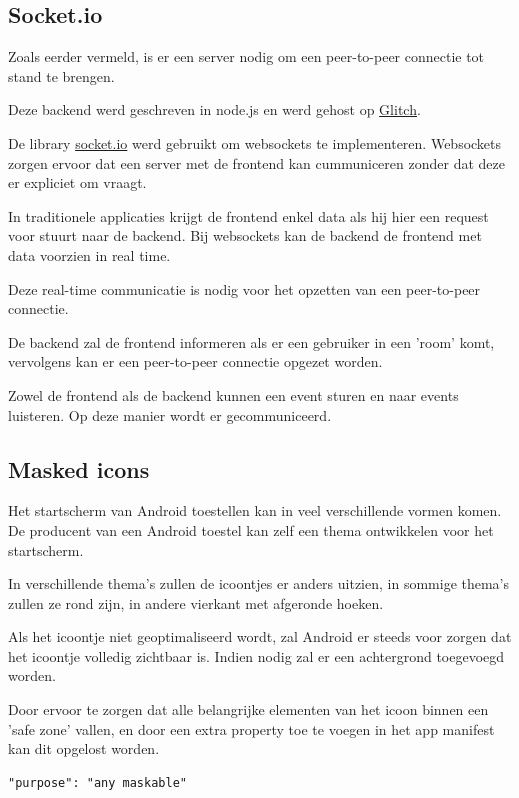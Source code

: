 	\subsection{Socket.io}
	
		Zoals eerder vermeld, is er een server nodig om een peer-to-peer connectie tot stand te brengen.
		
		Deze backend werd geschreven in node.js en werd gehost op \href{https://glitch.com/}{Glitch}.
		
		De library \href{https://socket.io/}{socket.io} werd gebruikt om websockets te implementeren. Websockets zorgen ervoor dat een server met de frontend kan cummuniceren zonder dat deze er expliciet om vraagt. 
		
		In traditionele applicaties krijgt de frontend enkel data als hij hier een request voor stuurt naar de backend. Bij websockets kan de backend de frontend met data voorzien in real time.
		\autocite{Mozilla2020e}
		
		Deze real-time communicatie is nodig voor het opzetten van een peer-to-peer connectie.
		
		De backend zal de frontend informeren als er een gebruiker in een 'room' komt, vervolgens kan er een peer-to-peer connectie opgezet worden.
		
		Zowel de frontend als de backend kunnen een event sturen en naar events luisteren. Op deze manier wordt er gecommuniceerd. 	
		
			
	\subsection{Masked icons}
	
		Het startscherm van Android toestellen kan in veel verschillende vormen komen. De producent van een Android toestel kan zelf een thema ontwikkelen voor het startscherm.
		
		In verschillende thema's zullen de icoontjes er anders uitzien, in sommige thema's zullen ze rond zijn, in andere vierkant met afgeronde hoeken. 
		
		Als het icoontje niet geoptimaliseerd wordt, zal Android er steeds voor zorgen dat het icoontje volledig zichtbaar is. Indien nodig zal er een achtergrond toegevoegd worden.
		
		Door ervoor te zorgen dat alle belangrijke elementen van het icoon binnen een 'safe zone' vallen, en door een extra property toe te voegen in het app manifest kan dit opgelost worden.
		
\begin{lstlisting}
"purpose": "any maskable" 
\end{lstlisting}

